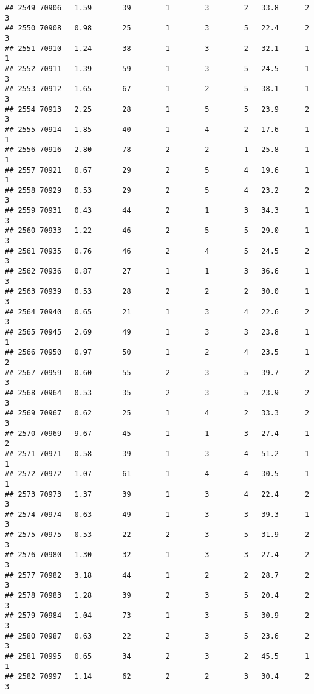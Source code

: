 \documentclass[
]{article}
\begin{document}
\begin{verbatim}
## 2549 70906   1.59       39        1        3        2   33.8      2      3
## 2550 70908   0.98       25        1        3        5   22.4      2      3
## 2551 70910   1.24       38        1        3        2   32.1      1      1
## 2552 70911   1.39       59        1        3        5   24.5      1      3
## 2553 70912   1.65       67        1        2        5   38.1      1      3
## 2554 70913   2.25       28        1        5        5   23.9      2      3
## 2555 70914   1.85       40        1        4        2   17.6      1      1
## 2556 70916   2.80       78        2        2        1   25.8      1      1
## 2557 70921   0.67       29        2        5        4   19.6      1      1
## 2558 70929   0.53       29        2        5        4   23.2      2      3
## 2559 70931   0.43       44        2        1        3   34.3      1      3
## 2560 70933   1.22       46        2        5        5   29.0      1      3
## 2561 70935   0.76       46        2        4        5   24.5      2      3
## 2562 70936   0.87       27        1        1        3   36.6      1      3
## 2563 70939   0.53       28        2        2        2   30.0      1      3
## 2564 70940   0.65       21        1        3        4   22.6      2      3
## 2565 70945   2.69       49        1        3        3   23.8      1      1
## 2566 70950   0.97       50        1        2        4   23.5      1      2
## 2567 70959   0.60       55        2        3        5   39.7      2      3
## 2568 70964   0.53       35        2        3        5   23.9      2      3
## 2569 70967   0.62       25        1        4        2   33.3      2      3
## 2570 70969   9.67       45        1        1        3   27.4      1      2
## 2571 70971   0.58       39        1        3        4   51.2      1      1
## 2572 70972   1.07       61        1        4        4   30.5      1      1
## 2573 70973   1.37       39        1        3        4   22.4      2      3
## 2574 70974   0.63       49        1        3        3   39.3      1      3
## 2575 70975   0.53       22        2        3        5   31.9      2      3
## 2576 70980   1.30       32        1        3        3   27.4      2      3
## 2577 70982   3.18       44        1        2        2   28.7      2      3
## 2578 70983   1.28       39        2        3        5   20.4      2      3
## 2579 70984   1.04       73        1        3        5   30.9      2      3
## 2580 70987   0.63       22        2        3        5   23.6      2      3
## 2581 70995   0.65       34        2        3        2   45.5      1      1
## 2582 70997   1.14       62        2        2        3   30.4      2      3

\end{verbatim}
\end{document}
